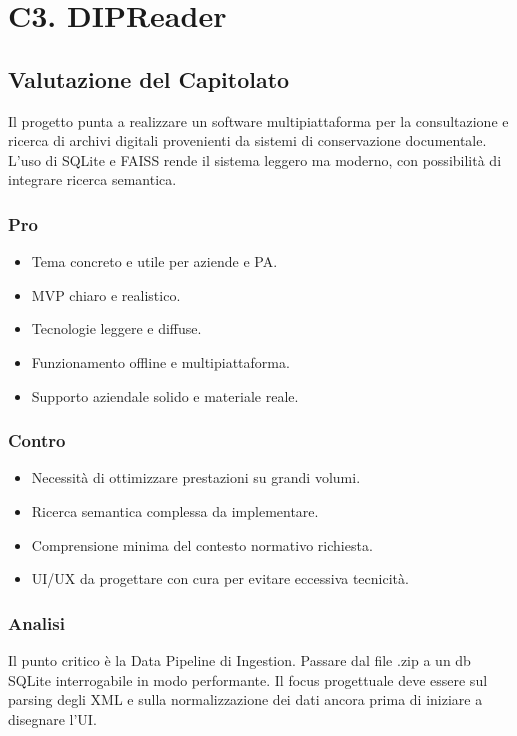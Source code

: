 \documentclass[a4paper, 11pt, oneside]{scrartcl} %
\begin{document}
\section{C3. DIPReader}
\subsection*{Valutazione del Capitolato}
Il progetto punta a realizzare un software multipiattaforma per la consultazione e ricerca di archivi digitali provenienti da sistemi di conservazione documentale.\\
L’uso di SQLite e FAISS rende il sistema leggero ma moderno, con possibilità di integrare ricerca semantica.

\subsubsection*{Pro}
\begin{itemize}
    \item Tema concreto e utile per aziende e PA.
    \item MVP chiaro e realistico.
    \item Tecnologie leggere e diffuse.
    \item Funzionamento offline e multipiattaforma.
    \item Supporto aziendale solido e materiale reale.
\end{itemize}

\subsubsection*{Contro}
\begin{itemize}
    \item Necessità di ottimizzare prestazioni su grandi volumi.
    \item Ricerca semantica complessa da implementare.
    \item Comprensione minima del contesto normativo richiesta.
    \item UI/UX da progettare con cura per evitare eccessiva tecnicità.
\end{itemize}
\subsubsection*{Analisi}
Il punto critico è la Data Pipeline di Ingestion. Passare dal file .zip a un db SQLite interrogabile in modo performante. Il focus progettuale deve essere sul parsing degli XML e sulla normalizzazione dei dati ancora prima di iniziare a disegnare l'UI.
\end{document}
